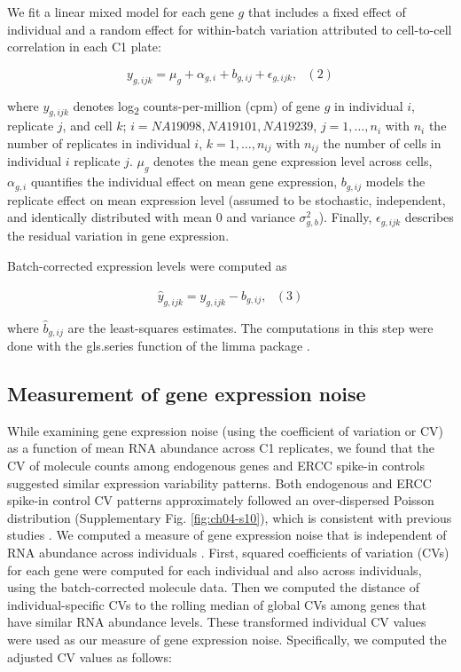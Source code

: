 We fit a linear mixed model for each gene $g$ that includes a fixed
effect of individual and a random effect for within-batch variation
attributed to cell-to-cell correlation in each C1 plate:

\[ y_{g,ijk} = \mu_{g} + \alpha_{g,i} + b_{g,ij} + \epsilon_{g,ijk}, \,\,\,\,(2)\]

where $y_{g,ijk}$ denotes log\textsubscript{2} counts-per-million (cpm)
of gene $g$ in individual $i$, replicate $j$, and cell $k$;
$i = NA19098, NA19101, NA19239$, $j = 1, \dots, n_i$ with $n_i$ the
number of replicates in individual $i$, $k = 1, \dots, n_{ij}$ with
$n_{ij}$ the number of cells in individual $i$ replicate $j$. $\mu_g$
denotes the mean gene expression level across cells, $\alpha_{g,i}$
quantifies the individual effect on mean gene expression, $b_{g,ij}$
models the replicate effect on mean expression level (assumed to be
stochastic, independent, and identically distributed with mean 0 and
variance $\sigma^2_{g,b}$). Finally, $\epsilon_{g,ijk}$ describes the
residual variation in gene expression.

Batch-corrected expression levels were computed as

\[ \widehat{y}_{g,ijk} = y_{g,ijk} - \widehat{b}_{g,ij}, \,\,\,\,(3)\]

where $\widehat{b}_{g,ij}$ are the least-squares estimates. The
computations in this step were done with the gls.series function of the
limma package \citep{Ritchie2015}.

\subsection{Measurement of gene expression
noise}\label{measurement-of-gene-expression-noise}

While examining gene expression noise (using the coefficient of
variation or CV) as a function of mean RNA abundance across C1
replicates, we found that the CV of molecule counts among endogenous
genes and ERCC spike-in controls suggested similar expression
variability patterns. Both endogenous and ERCC spike-in control CV
patterns approximately followed an over-dispersed Poisson distribution
(Supplementary Fig. \ref{fig:ch04-s10}), which is consistent with previous studies
\citep{Islam2014, Brennecke2013}. We computed a measure of gene
expression noise that is independent of RNA abundance across individuals
\citep{Kolodziejczyk2015, Newman2006}. First, squared coefficients of
variation (CVs) for each gene were computed for each individual and also
across individuals, using the batch-corrected molecule data. Then we
computed the distance of individual-specific CVs to the rolling median
of global CVs among genes that have similar RNA abundance levels. These
transformed individual CV values were used as our measure of gene
expression noise. Specifically, we computed the adjusted CV values as
follows:

